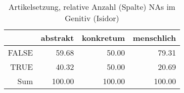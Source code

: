 \begin{table}[ht]
\centering
\begin{tabular}{rrrr}
  \hline
 & abstrakt & konkretum & menschlich \\ 
  \hline
FALSE & 59.68 & 50.00 & 79.31 \\ 
  TRUE & 40.32 & 50.00 & 20.69 \\ 
  Sum & 100.00 & 100.00 & 100.00 \\ 
   \hline
\end{tabular}
\caption{Artikelsetzung, relative Anzahl (Spalte) NAs im Genitiv (Isidor)} 
\end{table}
